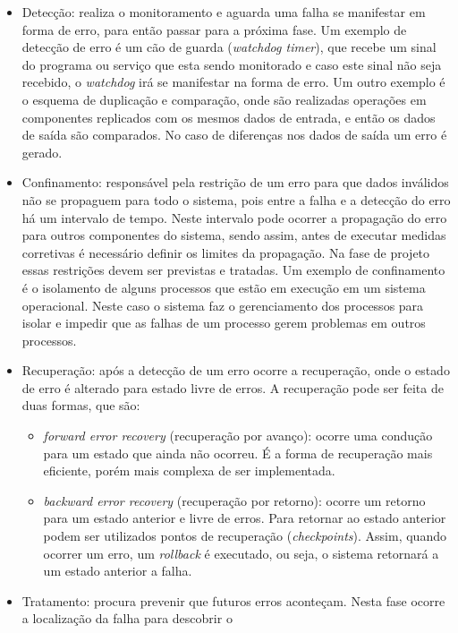 \begin{itemize}
 \item Detecção: realiza o monitoramento e aguarda uma falha se manifestar em forma de erro, para então passar para a próxima fase. 
 Um exemplo de detecção de erro é um cão de guarda (\textit{watchdog timer}), que recebe um sinal do programa ou serviço que esta sendo 
 monitorado e caso este sinal não seja recebido, o \textit{watchdog} irá se manifestar na forma de erro. 
 Um outro exemplo é o esquema de duplicação e comparação, onde são realizadas operações em componentes replicados com os mesmos dados de 
 entrada, e então os dados de saída são comparados. No caso de diferenças nos dados de saída um erro é gerado.
 \item Confinamento: responsável pela restrição de um erro para que dados inválidos não se propaguem para todo o sistema, pois entre a falha e a
 detecção do erro há um intervalo de tempo. Neste intervalo pode ocorrer a propagação do erro para outros componentes do sistema, sendo assim, 
 antes de executar medidas corretivas é necessário definir os limites da propagação. Na fase de projeto essas restrições devem ser previstas
 e tratadas. Um exemplo de confinamento é o isolamento de alguns processos que estão em execução em um sistema operacional. Neste caso o 
 sistema faz o gerenciamento dos processos para isolar e impedir que as falhas de um processo gerem problemas em outros processos.
 \item Recuperação: após a detecção de um erro ocorre a recuperação, onde o estado de erro é alterado para estado livre de erros. A recuperação
 pode ser feita de duas formas, que são:
 \begin{itemize}
  \item \textit{forward error recovery} (recuperação por avanço): ocorre uma condução para um estado que ainda não ocorreu. É a forma
  de recuperação mais eficiente, porém mais complexa de ser implementada.
  \item \textit{backward error recovery} (recuperação por retorno): ocorre um retorno para um estado anterior e livre de erros.
  Para retornar ao estado anterior podem ser utilizados pontos de recuperação (\textit{checkpoints}). Assim, quando ocorrer um erro, um 
  \textit{rollback} é executado, ou seja, o sistema retornará a um estado anterior a falha.
 \end{itemize}
 \item Tratamento: procura prevenir que futuros erros aconteçam. Nesta fase ocorre a localização da falha para descobrir o 

\end{itemize}
